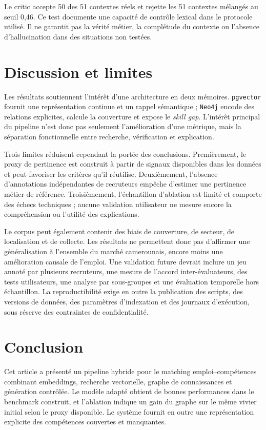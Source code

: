 \documentclass[10pt]{article}
\newcommand{\pgvector}{\texttt{pgvector}}
\newcommand{\neo}{\texttt{Neo4j}}
\begin{document}
Le critic accepte 50 des 51 contextes réels et rejette les 51 contextes mélangés au seuil 0,46. Ce test documente une capacité de contrôle lexical dans le protocole utilisé. Il ne garantit pas la vérité métier, la complétude du contexte ou l'absence d'hallucination dans des situations non testées.

\section{Discussion et limites}
Les résultats soutiennent l'intérêt d'une architecture en deux mémoires. \pgvector{} fournit une représentation continue et un rappel sémantique ; \neo{} encode des relations explicites, calcule la couverture et expose le \textit{skill gap}. L'intérêt principal du pipeline n'est donc pas seulement l'amélioration d'une métrique, mais la séparation fonctionnelle entre recherche, vérification et explication.

Trois limites réduisent cependant la portée des conclusions. Premièrement, le proxy de pertinence est construit à partir de signaux disponibles dans les données et peut favoriser les critères qu'il réutilise. Deuxièmement, l'absence d'annotations indépendantes de recruteurs empêche d'estimer une pertinence métier de référence. Troisièmement, l'échantillon d'ablation est limité et comporte des échecs techniques ; aucune validation utilisateur ne mesure encore la compréhension ou l'utilité des explications.

Le corpus peut également contenir des biais de couverture, de secteur, de localisation et de collecte. Les résultats ne permettent donc pas d'affirmer une généralisation à l'ensemble du marché camerounais, encore moins une amélioration causale de l'emploi. Une validation future devrait inclure un jeu annoté par plusieurs recruteurs, une mesure de l'accord inter-évaluateurs, des tests utilisateurs, une analyse par sous-groupes et une évaluation temporelle hors échantillon. La reproductibilité exige en outre la publication des scripts, des versions de données, des paramètres d'indexation et des journaux d'exécution, sous réserve des contraintes de confidentialité.

\section{Conclusion}
Cet article a présenté un pipeline hybride pour le matching emploi--compétences combinant embeddings, recherche vectorielle, graphe de connaissances et génération contrôlée. Le modèle adapté obtient de bonnes performances dans le benchmark construit, et l'ablation indique un gain du graphe sur le même vivier initial selon le proxy disponible. Le système fournit en outre une représentation explicite des compétences couvertes et manquantes.
\end{document}
